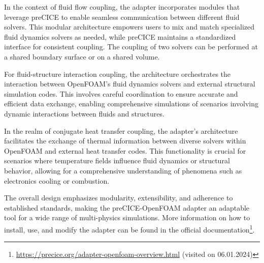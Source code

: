 In the context of fluid flow coupling, the adapter incorporates modules that leverage preCICE to enable seamless communication between different fluid solvers. This modular architecture empowers users to mix and match specialized fluid dynamics solvers as needed, while preCICE maintains a standardized interface for consistent coupling. The coupling of two solvers can be performed at a shared boundary surface or on a shared volume.

For fluid-structure interaction coupling, the architecture orchestrates the interaction between OpenFOAM's fluid dynamics solvers and external structural simulation codes. This involves careful coordination to ensure accurate and efficient data exchange, enabling comprehensive simulations of scenarios involving dynamic interactions between fluids and structures.

In the realm of conjugate heat transfer coupling, the adapter's architecture facilitates the exchange of thermal information between diverse solvers within OpenFOAM and external heat transfer codes. This functionality is crucial for scenarios where temperature fields influence fluid dynamics or structural behavior, allowing for a comprehensive understanding of phenomena such as electronics cooling or combustion.

The overall design emphasizes modularity, extensibility, and adherence to established standards, making the preCICE-OpenFOAM adapter an adaptable tool for a wide range of multi-physics simulations. More information on how to install, use, and modify the adapter can be found in the official documentation\footnote{\url{https://precice.org/adapter-openfoam-overview.html} (visited on 06.01.2024)}.

